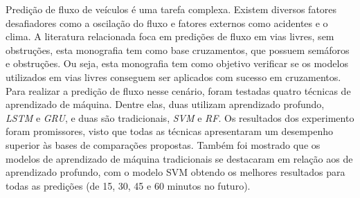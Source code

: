 Predição de fluxo de veículos é uma tarefa complexa. Existem diversos fatores desafiadores como a oscilação do fluxo e fatores externos como acidentes e o clima. A literatura relacionada foca em predições de fluxo em vias livres, sem obstruções, esta monografia tem como base cruzamentos, que possuem semáforos e obstruções. Ou seja, esta monografia tem como objetivo verificar se os modelos utilizados em vias livres conseguem ser aplicados com sucesso em cruzamentos.  Para realizar a predição de fluxo nesse cenário, foram testadas quatro técnicas de aprendizado de máquina. Dentre elas, duas utilizam aprendizado profundo, \textit{\acrfull{LSTM}} e \textit{\acrfull{GRU}}, e duas são tradicionais, \textit{\acrfull{SVM}} e \textit{\acrfull{RF}}. Os resultados dos experimento foram promissores, visto que todas as técnicas apresentaram um desempenho superior às bases de comparações propostas. Também foi mostrado que os modelos de aprendizado de máquina tradicionais se destacaram em relação aos de aprendizado profundo, com o modelo \acrshort{SVM} obtendo os melhores resultados para todas as predições (de 15, 30, 45 e 60 minutos no futuro).